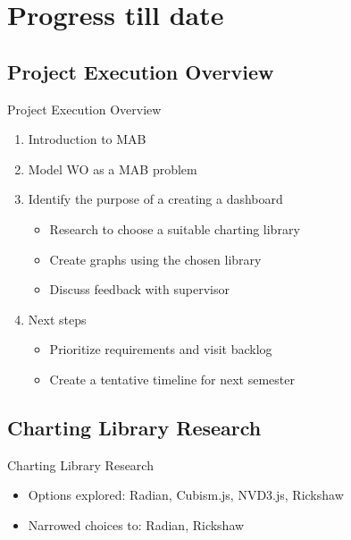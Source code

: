 \documentclass{beamer}
\begin{document}
\section{Progress till date}

\subsection{Project Execution Overview}
\begin{frame}{Project Execution Overview}
\begin{enumerate}
	\item Introduction to MAB
	\item Model WO as a MAB problem
	\item Identify the purpose of a creating a dashboard 
	\begin{itemize}
		\item Research to choose a suitable charting library
		\item Create graphs using the chosen library
		\item Discuss feedback with supervisor
	\end{itemize}
	\item Next steps
	\begin{itemize}
		\item Prioritize requirements and visit backlog
		\item Create a tentative timeline for next semester
	\end{itemize}
\end{enumerate}
\end{frame}

\subsection{Charting Library Research}
\begin{frame}{Charting Library Research}
	\begin{itemize}
		\item Options explored: Radian, Cubism.js, NVD3.js, Rickshaw
		\item Narrowed choices to: Radian, Rickshaw
	\end{itemize}
\end{frame}
\end{document}
